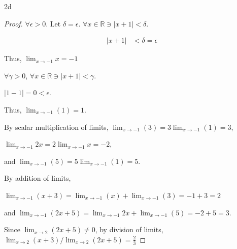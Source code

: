 \documentclass{article}
\newcommand{\R}{\mathbb{R}}
\newcommand{\abs}[1]{\left\lvert #1\right\rvert}
\begin{document}
\begin{PROB}{2d}\label{Problem 2d.}
\end{PROB}
\begin{proof}
    $\forall \epsilon > 0$. Let $\delta = \epsilon$. $\forall x \in \R \ni \abs{x + 1} < \delta$.   
    
    \begin{align*}
        \abs{x + 1} &< \delta =\epsilon
    \end{align*}

    Thus, $\lim_{x \to -1} x = -1$ 

    $\forall \gamma > 0$, $\forall x \in \R \ni \abs{x + 1} < \gamma$.   
    
    $\abs{1 - 1} = 0 < \epsilon$. 
    
    Thus, $\lim_{x \to -1}(1) = 1$.
    
    
    By scalar multiplication of limits, 
    $\lim_{x \to -1}(3) = 3\lim_{x \to -1}(1) = 3$, 
    
    $\lim_{x \to -1} 2x = 2\lim_{x \to -1} x = -2$, 
    
    and $\lim_{x \to -1}(5) = 5\lim_{x \to -1}(1) = 5$. 
    \bigskip
    
    By addition of limits, 
    
    $\lim_{x \to -1} (x + 3) = \lim_{x \to -1} (x) + \lim_{x \to -1}(3) = -1 + 3 = 2$
    
    and $\lim_{x \to-1} (2x +5)  = \lim_{x \to -1} 2x + \lim_{x \to -1}(5) = -2 + 5 = 3$. 
    
    Since $\lim_{x \to 2} (2x +5) \neq 0$, by division of limits, $\lim_{x \to 2} (x + 3) / \lim_{x \to 2} (2x +5) = \frac{2}{3}$  
\end{proof}

\bigskip
\end{document}
